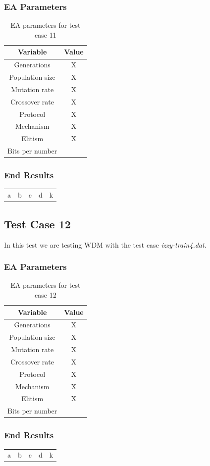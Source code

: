 \subsubsection{EA Parameters}\label{sec:test-case-11-parameters}
\begin{table}
	\begin{tabular}{c c}
		Variable & Value \\
		\hline
		Generations & X \\
		\hline
		Population size & X \\
		\hline
		Mutation rate & X \\
		\hline
		Crossover rate & X \\
		\hline
		Protocol & X \\
		\hline
		Mechanism & X \\
		\hline
		Elitism & X \\
		\hline
		Bits per number & \\
	\end{tabular}
	\caption{EA parameters for test case 11}
\end{table}
\subsubsection{End Results}\label{sec:test-case-11-results}
\begin{table}
	\begin{tabular}{c c c c c}
		a & b & c & d & k \\
	\end{tabular}
\end{table}

\subsection{Test Case 12}\label{sec:test-case-12}
In this test we are testing WDM with the test case
\textit{izzy-train4.dat}.
\subsubsection{EA Parameters}\label{sec:test-case-12-parameters}
\begin{table}
	\begin{tabular}{c c}
		Variable & Value \\
		\hline
		Generations & X \\
		\hline
		Population size & X \\
		\hline
		Mutation rate & X \\
		\hline
		Crossover rate & X \\
		\hline
		Protocol & X \\
		\hline
		Mechanism & X \\
		\hline
		Elitism & X \\
		\hline
		Bits per number & \\
	\end{tabular}
	\caption{EA parameters for test case 12}
\end{table}
\subsubsection{End Results}\label{sec:test-case-12-results}
\begin{table}
	\begin{tabular}{c c c c c}
		a & b & c & d & k \\
	\end{tabular}
\end{table}
